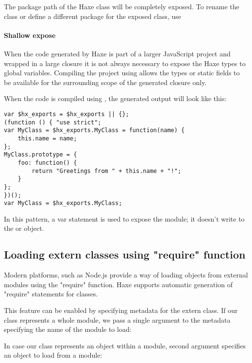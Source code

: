The package path of the Haxe class will be completely exposed. To rename the class or define a different package for the exposed class, use 

\paragraph{Shallow expose}

When the code generated by Haxe is part of a larger JavaScript project and wrapped in a large closure it is not always necessary to expose the Haxe types to global variables.
Compiling the project using  allows the types or static fields to be available for the surrounding scope of the generated closure only.

When the code is compiled using , the generated output will look like this:

\begin{lstlisting}
var $hx_exports = $hx_exports || {};
(function () { "use strict";
var MyClass = $hx_exports.MyClass = function(name) {
	this.name = name;
};
MyClass.prototype = {
	foo: function() {
		return "Greetings from " + this.name + "!";
	}
};
})();
var MyClass = $hx_exports.MyClass;
\end{lstlisting}

In this pattern, a var statement is used to expose the module; it doesn't write to the  or  object. 

\subsection{Loading extern classes using "require" function}
\label{target-javascript-require}

Modern  platforms, such as Node.js provide a way of loading objects
from external modules using the "require" function. Haxe supports automatic generation
of "require" statements for  classes.

This feature can be enabled by specifying  metadata for the extern class. If our  class represents a whole module, we pass a single argument to the  metadata specifying the name of the module to load:


In case our  class represents an object within a module, second  argument specifies an object to load from a module:

